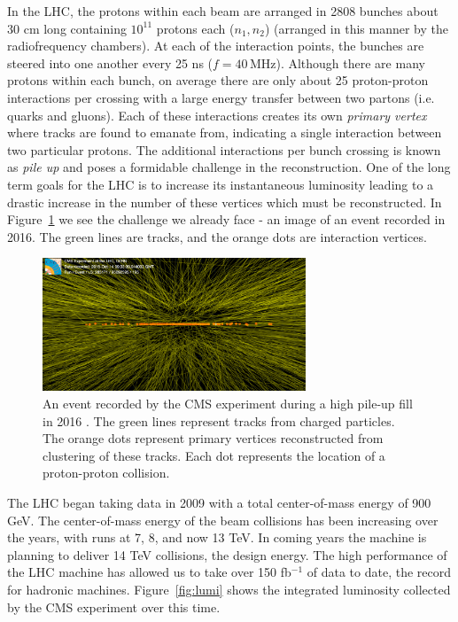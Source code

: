 In the LHC, the protons within each beam are arranged in 2808 bunches about 30 cm long containing $10^{11}$ protons each ($n_{1}, n_{2}$) (arranged in this manner by the radiofrequency chambers). At each of the interaction points, the bunches are steered into one another every 25 ns ($f=40\,\textrm{MHz}$). Although there are many protons within each bunch, on average there are only about 25 proton-proton interactions per crossing with a large energy transfer between two partons (i.e. quarks and gluons). Each of these interactions creates its own \textit{primary vertex} where tracks are found to emanate from, indicating a single interaction between two particular protons. The additional interactions per bunch crossing is known as \textit{pile up} and poses a formidable challenge in the reconstruction. One of the long term goals for the LHC is to increase its instantaneous luminosity leading to a drastic increase in the number of these vertices which must be reconstructed. In Figure~\ref{fig:pu} we see  the challenge we already face - an image of an event recorded in 2016. The green lines are tracks, and the orange dots are interaction vertices.

\begin{figure}
\centering
\includegraphics[width=0.7\textwidth]{figs/highpileup0_4.png}
\caption[An event recorded by the CMS experiment during a high pile-up fill in 2016.]{An event recorded by the CMS experiment during a high pile-up fill in 2016 \cite{pu}. The green lines represent tracks from charged particles. The orange dots represent primary vertices reconstructed from clustering of these tracks. Each dot represents the location of a proton-proton collision.}
\label{fig:pu}
\end{figure}

The LHC began taking data in 2009 with a total center-of-mass energy of 900 GeV. The center-of-mass energy of the beam collisions has been increasing over the years, with runs at 7, 8, and now 13 TeV. In coming years the machine is planning to deliver 14 TeV collisions, the design energy. The high performance of the LHC machine has allowed us to take over 150 fb$^{-1}$ of data to date, the record for hadronic machines. Figure~\ref{fig:lumi} shows the integrated luminosity collected by the CMS experiment over this time.

